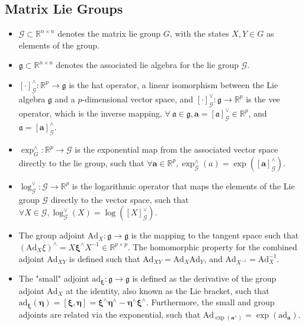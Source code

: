 \subsection{Matrix Lie Groups}
\begin{itemize}
  \item $\mathcal{G} \subset \mathbb{R}^{n\times n}$ denotes the matrix lie group $G$, with the states $X,Y\in G$ as elements of the group.
  \item $\mathfrak{g} \subset \mathbb{R}^{n\times n}$ denotes the associated lie algebra for the lie group $\mathcal{G}$.
  \item $[\cdot]_\mathcal{G}^\wedge: \mathbb{R}^p \to \mathfrak{g}$ is the hat operator, a linear isomorphism between the Lie algebra $\mathfrak{g}$ and a $p$-dimensional vector space, and $[\cdot]_\mathcal{G}^\vee: \mathfrak{g}\to \mathbb{R}^p$ is the vee operator, which is the inverse mapping, $\forall \ \mathfrak{a} \in \mathfrak{g}, \mathbf{a} = [\mathfrak{a}]_\mathcal{G}^\vee \in \mathbb{R}^p$, and $\mathfrak{a}=[\mathbf{a}]_\mathcal{G}^\wedge$.
  \item $\exp_G^\wedge: \mathbb{R}^p \to \mathcal{G}$ is the exponential map from the associated vector space directly to the lie group, such that $\forall \mathbf{a} \in \mathbb{R}^p, \exp_\mathcal{G}^\wedge(a) = \exp([\mathbf{a}]_\mathcal{G}^\wedge)$.
  \item $\log_\mathcal{G}^\vee: \mathcal{G}\to \mathbb{R}^p$ is the logarithmic operator that maps the elements of the Lie group $\mathcal{G}$ directly to the vector space, such that $\forall X \in \mathcal{G}, \log_\mathcal{G}^\vee(X)=\log([X]_\mathcal{G}^\vee)$.
  \item The group adjoint $\mathrm{Ad}_X: \mathfrak{g}\to\mathfrak{g}$ is the mapping to the tangent space such that $(\mathrm{Ad}_X \mathbb{\xi})^\wedge=X\boldsymbol{\xi}^\wedge X^{-1} \in \mathbb{R}^{p\times p}$. The homomorphic property for the combined adjoint $\mathrm{Ad}_{XY}$ is defined such that $\mathrm{Ad}_{XY}=\mathrm{Ad}_X\mathrm{Ad}_Y$, and $\mathrm{Ad}_{X^{-1}}=\mathrm{Ad}_X^{-1}$.
  \item The "small" adjoint $\mathrm{ad}_{\boldsymbol{\xi}}: \mathfrak{g}\to\mathfrak{g}$ is defined as the derivative of the group adjoint $\mathrm{Ad}_X$ at the identity, also known as the Lie bracket, such that $\mathrm{ad}_{\boldsymbol{\xi}}(\boldsymbol{\eta})=[\boldsymbol{\xi},\boldsymbol{\eta}] = \boldsymbol{\xi}^\wedge\boldsymbol{\eta}^\wedge-\boldsymbol{\eta}^\wedge\boldsymbol{\xi}^\wedge$. Furthermore, the small and group adjoints are related via the exponential, such that $\mathrm{Ad}_{\exp(\mathbf{a}^\wedge)}=\exp(\mathrm{ad}_\mathbf{a})$.
\end{itemize}
